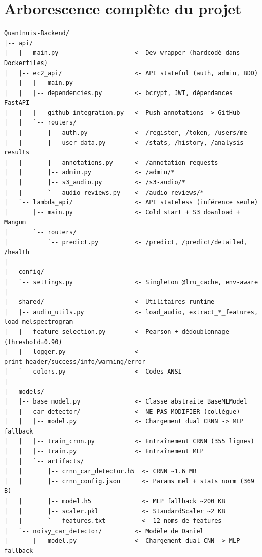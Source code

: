 \documentclass[11pt,a4paper]{article}
\begin{document}
\section{Arborescence complète du projet}

\begin{lstlisting}[style=tree,caption={Arborescence Quantnuis-Backend (~20 GB)}]
Quantnuis-Backend/
|-- api/
|   |-- main.py                     <- Dev wrapper (hardcodé dans Dockerfiles)
|   |-- ec2_api/                    <- API stateful (auth, admin, BDD)
|   |   |-- main.py
|   |   |-- dependencies.py         <- bcrypt, JWT, dépendances FastAPI
|   |   |-- github_integration.py   <- Push annotations -> GitHub
|   |   `-- routers/
|   |       |-- auth.py             <- /register, /token, /users/me
|   |       |-- user_data.py        <- /stats, /history, /analysis-results
|   |       |-- annotations.py      <- /annotation-requests
|   |       |-- admin.py            <- /admin/*
|   |       |-- s3_audio.py         <- /s3-audio/*
|   |       `-- audio_reviews.py    <- /audio-reviews/*
|   `-- lambda_api/                 <- API stateless (inférence seule)
|       |-- main.py                 <- Cold start + S3 download + Mangum
|       `-- routers/
|           `-- predict.py          <- /predict, /predict/detailed, /health
|
|-- config/
|   `-- settings.py                 <- Singleton @lru_cache, env-aware
|
|-- shared/                         <- Utilitaires runtime
|   |-- audio_utils.py              <- load_audio, extract_*_features, load_melspectrogram
|   |-- feature_selection.py        <- Pearson + dédoublonnage (threshold=0.90)
|   |-- logger.py                   <- print_header/success/info/warning/error
|   `-- colors.py                   <- Codes ANSI
|
|-- models/
|   |-- base_model.py               <- Classe abstraite BaseMLModel
|   |-- car_detector/               <- NE PAS MODIFIER (collègue)
|   |   |-- model.py                <- Chargement dual CRNN -> MLP fallback
|   |   |-- train_crnn.py           <- Entraînement CRNN (355 lignes)
|   |   |-- train.py                <- Entraînement MLP
|   |   `-- artifacts/
|   |       |-- crnn_car_detector.h5  <- CRNN ~1.6 MB
|   |       |-- crnn_config.json      <- Params mel + stats norm (369 B)
|   |       |-- model.h5              <- MLP fallback ~200 KB
|   |       |-- scaler.pkl            <- StandardScaler ~2 KB
|   |       `-- features.txt          <- 12 noms de features
|   `-- noisy_car_detector/         <- Modèle de Daniel
|       |-- model.py                <- Chargement dual CNN -> MLP fallback

\end{lstlisting}
\end{document}
